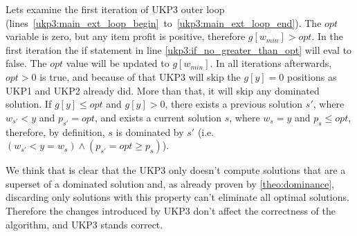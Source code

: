 \documentclass[12pt]{article}
\begin{document}
Lets examine the first iteration of UKP3 outer loop (lines~\ref{ukp3:main_ext_loop_begin}~to~\ref{ukp3:main_ext_loop_end}). The \(opt\) variable is zero, but any item profit is positive, therefore \(g[w_{min}] > opt\). In the first iteration the if statement in line \ref{ukp3:if_no_greater_than_opt} will eval to false. The \(opt\) value will be updated to \(g[w_{min}]\). In all iterations afterwards, \(opt > 0\) is true, and because of that UKP3 will skip the \(g[y] = 0\) positions as UKP1 and UKP2 already did. More than that, it will skip any dominated solution. If \(g[y] \leq opt\) and \(g[y] > 0\), there exists a previous solution \(s'\), where \(w_{s'} < y\) and \(p_{s'} = opt\), and exists a current solution \(s\), where \(w_s = y\) and \(p_s \leq opt\), therefore, by definition, \(s\) is dominated by \(s'\) (i.e. \((w_{s'} < y = w_s) \land (p_{s'} = opt \geq p_s)\)).

We think that is clear that the UKP3 only doesn't compute solutions that are a superset of a dominated solution and, as already proven by \autoref{theo:dominance}, discarding only solutions with this property can't eliminate all optimal solutions. Therefore the changes introduced by UKP3 don't affect the correctness of the algorithm, and UKP3 stands correct.


\end{document}
